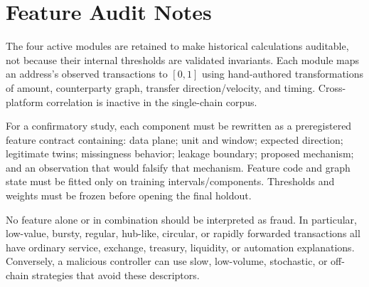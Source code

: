 \section{Feature Audit Notes}\label{app:signals}

The four active modules are retained to make historical calculations auditable,
not because their internal thresholds are validated invariants.  Each module
maps an address's observed transactions to $[0,1]$ using hand-authored
transformations of amount, counterparty graph, transfer direction/velocity, and
timing.  Cross-platform correlation is inactive in the single-chain corpus.

For a confirmatory study, each component must be rewritten as a preregistered
feature contract containing: data plane; unit and window; expected direction;
legitimate twins; missingness behavior; leakage boundary; proposed mechanism;
and an observation that would falsify that mechanism.  Feature code and graph
state must be fitted only on training intervals/components.  Thresholds and
weights must be frozen before opening the final holdout.

No feature alone or in combination should be interpreted as fraud.  In
particular, low-value, bursty, regular, hub-like, circular, or rapidly forwarded
transactions all have ordinary service, exchange, treasury, liquidity, or
automation explanations.  Conversely, a malicious controller can use slow,
low-volume, stochastic, or off-chain strategies that avoid these descriptors.
